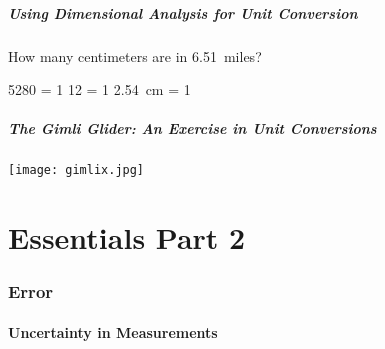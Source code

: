 \documentclass[notes=only]{beamer}
\begin{document}
\begin{frame}[t]
	\frametitle{Using Dimensional Analysis for Unit Conversion}
	How many centimeters are in \qty{6.51}{miles}?
	\begin{center}
		\qty{5280}{\foot} = \qty{1}{\mile} \qquad
		\qty{12}{\inch} = \qty{1}{\foot} \qquad
		\qty{2.54}{\centi\meter} = \qty{1}{\inch}
	\end{center}


\end{frame}

\begin{frame}[c]
	\frametitle{The Gimli Glider: An Exercise in Unit Conversions}
	\begin{center}
		\texttt{[image: gimlix.jpg]}
	\end{center}
\end{frame}

\part{Essentials Part 2}

\section{Error}

\subsection{Uncertainty in Measurements}
\end{document}
